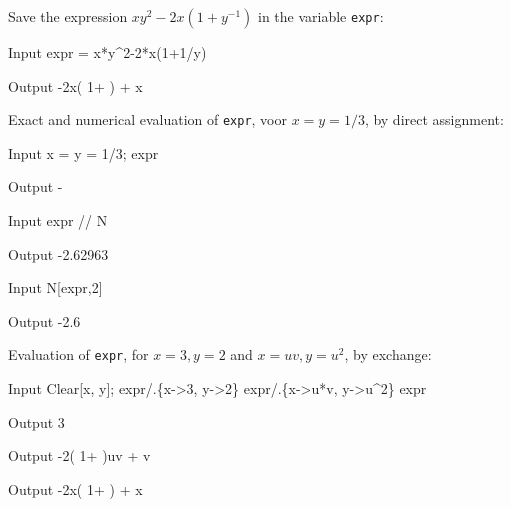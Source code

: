 \begin{example}
Save the expression $xy^2-2x(1+y^{-1})$ in the variable 	 \lstinline{expr}:
\begin{mdframed}[default,backgroundcolor=gray!40,roundcorner=8pt]
	\begin{mmaCell}[]{Input}
		expr =  x*y^2-2*x(1+1/y)
	\end{mmaCell}
	\begin{mmaCell}[moredefined={expr}]{Output}
		-2x( 1+ ) + x
	\end{mmaCell}
\end{mdframed}	
Exact and numerical evaluation of \lstinline{expr}, voor $x=y=1/3$, by direct assignment:
\begin{mdframed}[default,backgroundcolor=gray!40,roundcorner=8pt]
	\begin{mmaCell}[moredefined={expr}]{Input}
		x = y = 1/3;
		expr
	\end{mmaCell}
	\begin{mmaCell}[moredefined={expr}]{Output}
		-
	\end{mmaCell}
	
	\begin{mmaCell}[moredefined={expr}]{Input}
		expr // N
	\end{mmaCell}
	\begin{mmaCell}[moredefined={expr}]{Output}
		-2.62963
	\end{mmaCell}

	\begin{mmaCell}[moredefined={expr}]{Input}
		N[expr,2]
	\end{mmaCell}
	\begin{mmaCell}[moredefined={expr}]{Output}
		-2.6
	\end{mmaCell}
\end{mdframed}
Evaluation of \lstinline{expr}, for $x=3, y=2$ and $x= uv , y = u^2$, by exchange:
\begin{mdframed}[default,backgroundcolor=gray!40,roundcorner=8pt]
	\begin{mmaCell}[moredefined={expr}]{Input}
		Clear[x, y];
		expr/.\{x->3, y->2\}
		expr/.\{x->u*v, y->u^2\}
		expr  
	\end{mmaCell}
	\begin{mmaCell}[moredefined={expr}]{Output}
		3
	\end{mmaCell}
	\begin{mmaCell}[moredefined={expr}]{Output}
		-2( 1+ )uv + v
	\end{mmaCell}
	\begin{mmaCell}[moredefined={expr}]{Output}
		-2x( 1+ ) + x
	\end{mmaCell}
\end{mdframed}
\end{example}

